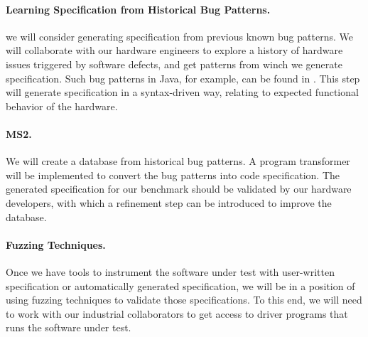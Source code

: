 \documentclass[fleqn,12pt]{article}
\begin{document}



\paragraph{Learning Specification from Historical Bug Patterns.}
we will consider generating specification from previous known bug
patterns.  We will collaborate with our hardware engineers to explore
a history of hardware issues triggered by software defects, and get
patterns from winch we generate specification.  Such bug patterns in
Java, for example, can be found in \cite{web:findbugs_bugs}.  This
step will generate specification in a syntax-driven way, relating to
expected functional behavior of the hardware.




\paragraph{MS2.} We will create  a database from historical  bug patterns. A program transformer will be implemented to convert the bug patterns
into code specification. The generated specification for our benchmark
should be validated by our hardware developers, with which a
refinement step can be introduced to improve the database.





\paragraph{Fuzzing Techniques.}
Once we have tools to instrument the software under test with user-written
specification or automatically generated specification, we will be in a position of using fuzzing techniques
to validate those specifications. To this end, we will need to work
with our industrial collaborators to get access to driver programs
that runs the software under test.
\end{document}
